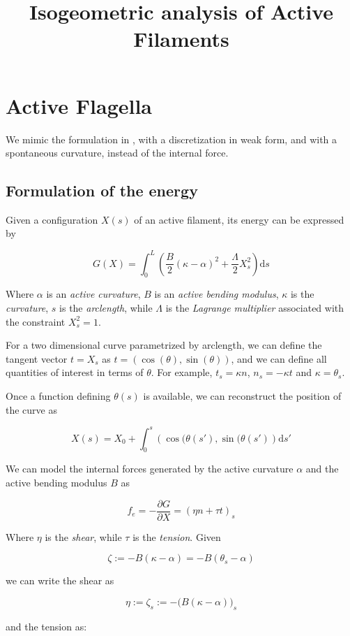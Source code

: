 \documentclass[12pt]{article}
\renewcommand{\d}{\mathrm{d}}
\begin{document}
\title{Isogeometric analysis of Active Filaments}

\section{Active Flagella}\label{active-flagella}

We mimic the formulation in \cite{CamaletJulicher2000}, with a
discretization in weak form, and with a spontaneous curvature, instead
of the internal force.

\subsection{Formulation of the energy}\label{formulation-of-the-energy}

Given a configuration \(X(s)\) of an active filament, its energy can be expressed by

\[G(X) = \int_0^L \left( \frac{B}{2}(\kappa-\alpha)^2 +
  \frac{\Lambda}{2} X_s^2 \right) \d s\]

Where $\alpha$ is an \emph{active curvature}, $B$ is an \emph{active
  bending modulus}, $\kappa$ is the \emph{curvature}, $s$ is the
\emph{arclength}, while $\Lambda$ is the \emph{Lagrange multiplier}
associated with the constraint $X_s^2 = 1$.

For a two dimensional curve parametrized by arclength, we can define
the tangent vector $t = X_s$ as $t = (\cos(\theta), \sin(\theta))$, and
we can define all quantities of interest in terms of $\theta$. For
example, $t_s = \kappa n$, $n_s = -\kappa t$ and $\kappa = \theta_s$.

Once a function defining \(\theta(s)\) is available, we can reconstruct
the position of the curve as

\[X(s) = X_0 + \int_0^s \left(\cos(\theta(s'), \sin(\theta(s') \right)
\d s'\]

We can model the internal forces generated by the active curvature
$\alpha$ and the active bending modulus $B$ as

\[f_e = -\frac{\partial G}{\partial X} = (\eta n + \tau t)_s\]

Where \(\eta\) is the \emph{shear}, while $\tau$ is the
\emph{tension}. Given 

\[\zeta := -B(\kappa - \alpha) = -B(\theta_s - \alpha)\]

we can write the shear as

\[\eta := \zeta_s := -\big( B(\kappa - \alpha) \big)_s\]

and the tension as:
\end{document}

